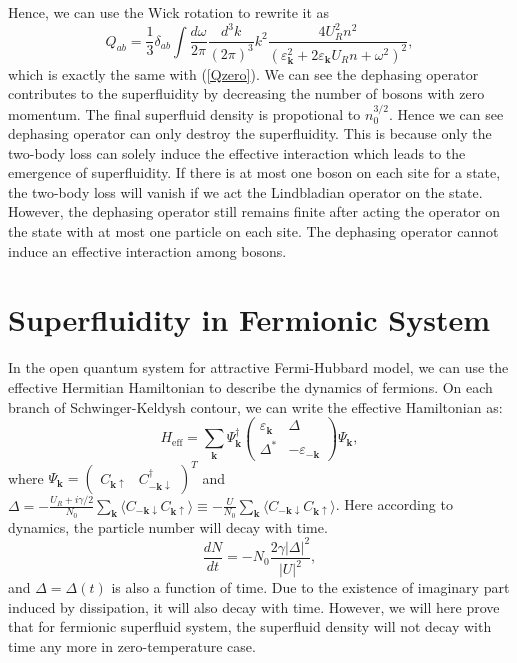 \documentclass[aps,onecolumn,superscriptaddress,notitlepage,longbibliography]{revtex4-1}
\begin{document}
Hence, we can use the Wick rotation to rewrite it as
\begin{equation}
  Q_{a b} = \frac{1}{3} \delta_{a b} \int \frac{d \omega}{2 \pi} \frac{d^3
  k}{(2 \pi)^3} k^2 \frac{4 U_R^2 n^2}{(\varepsilon_{\mathbf{k}}^2 + 2
  \varepsilon_{\mathbf{k}} U_R n + \omega^2)^2},
\end{equation}
which is exactly the same with (\ref{Qzero}). We can see the dephasing
operator contributes to the superfluidity by decreasing the number of bosons
with zero momentum. The final superfluid density is propotional to $n_0^{3 /
2}$. Hence we can see dephasing operator can only destroy the superfluidity.
This is because only the two-body loss can solely induce the effective
interaction which leads to the emergence of superfluidity. If there is at most
one boson on each site for a state, the two-body loss will vanish if we act
the Lindbladian operator on the state. However, the dephasing operator still
remains finite after acting the operator on the state with at most one
particle on each site. The dephasing operator cannot induce an effective
interaction among bosons.

\section{Superfluidity in Fermionic System}

In the open quantum system for attractive Fermi-Hubbard model, we can use the
effective Hermitian Hamiltonian to describe the dynamics of fermions. On each
branch of Schwinger-Keldysh contour, we can write the effective Hamiltonian
as:
\begin{equation}
  H_{\text{eff}} = \sum_{\mathbf{k}} \Psi_{\mathbf{k}}^{\dagger}
  \left(\begin{array}{cc}
    \varepsilon_{\mathbf{k}} & \Delta\\
    \Delta^{\ast} & - \varepsilon_{-\mathbf{k}}
  \end{array}\right) \Psi_{\mathbf{k}},
\end{equation}
where $\Psi_{\mathbf{k}} = \left(\begin{array}{cc}
  C_{\mathbf{k} \uparrow} & C^{\dagger}_{-\mathbf{k} \downarrow}
\end{array}\right)^T$ and $\Delta = - \frac{U_R + i \gamma / 2}{N_0}
\sum_{\mathbf{k}} \langle C_{-\mathbf{k} \downarrow} C_{\mathbf{k}
\uparrow} \rangle \equiv - \frac{U}{N_0} \sum_{\mathbf{k}} \langle
C_{-\mathbf{k} \downarrow} C_{\mathbf{k} \uparrow} \rangle$.
Here according to dynamics, the particle number will decay with time.
\begin{equation}
  \frac{d N}{d t} = - N_0 \frac{2 \gamma | \Delta |^2}{| U |^2},
\end{equation}
and $\Delta = \Delta (t)$ is also a function of time. Due to the existence
of imaginary part induced by dissipation, it will also decay with time.
However, we will here prove that for fermionic superfluid system, the
superfluid density will not decay with time any more in zero-temperature case.
\end{document}
